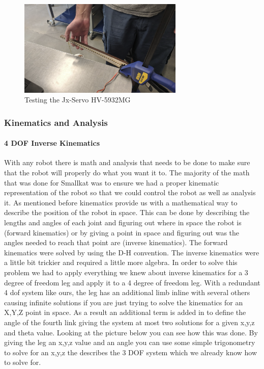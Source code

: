                 \begin{figure}[H]
                    \centering
                    \includegraphics[width=0.7\textwidth]{figures/TestingMotors.png}
                    \caption{Testing the Jx-Servo HV-5932MG}
                    \label{fig:MotorTesting}
                \end{figure}        

        \subsubsection{Kinematics and Analysis}
        
            \paragraph{4 DOF Inverse Kinematics} With any robot there is math and analysis that needs to be done to make sure that the robot will properly do what you want it to. The majority of the math that was done for Smallkat was to ensure we had a proper kinematic representation of the robot so that we could control the robot as well as analysis it. As mentioned before kinematics provide us with a mathematical way to describe the position of the robot in space. This can be done by describing the lengths and angles of each joint and figuring out where in space the robot is (forward kinematics) or by giving a point in space and figuring out was the angles needed to reach that point are (inverse kinematics). The forward kinematics were solved by using the D-H convention. The inverse kinematics were a little bit trickier and required a little more algebra. In order to solve this problem we had to apply everything we knew about inverse kinematics for a 3 degree of freedom leg and apply it to a 4 degree of freedom leg. With a redundant 4 dof system like ours, the leg has an additional limb inline with several others causing infinite solutions if you are just trying to solve the kinematics for an X,Y,Z point in space. As a result an additional term is added in to define the angle of the fourth link giving the system at most two solutions for a given x,y,z and theta value. Looking at the picture below you can see how this was done. By giving the leg an x,y,z value and an angle you can use some simple trigonometry to solve for an x,y,z the describes the 3 DOF system which we already know how to solve for. 
            
